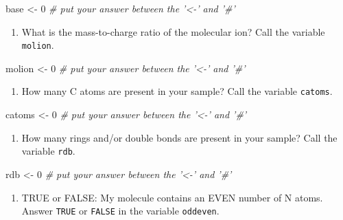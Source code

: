 \documentclass[]{tufte-book}
\newenvironment{Shaded}{}{}
\newcommand{\CommentTok}[1]{\textcolor[rgb]{0.38,0.63,0.69}{\textit{#1}}}
\newcommand{\DecValTok}[1]{\textcolor[rgb]{0.25,0.63,0.44}{#1}}
\newcommand{\NormalTok}[1]{#1}
\newcommand{\StringTok}[1]{\textcolor[rgb]{0.25,0.44,0.63}{#1}}
\providecommand{\tightlist}{%
  \setlength{\itemsep}{0pt}\setlength{\parskip}{0pt}}
\begin{document}
\begin{Shaded}
\begin{Highlighting}[]
\NormalTok{base <-}\StringTok{ }\DecValTok{0}     \CommentTok{# put your answer between the '<-' and '#'}
\end{Highlighting}
\end{Shaded}

\begin{enumerate}
\def\labelenumi{\arabic{enumi}.}
\setcounter{enumi}{1}
\tightlist
\item
  What is the mass-to-charge ratio of the molecular ion? Call the variable \texttt{molion}.
\end{enumerate}

\begin{Shaded}
\begin{Highlighting}[]
\NormalTok{molion <-}\StringTok{ }\DecValTok{0}     \CommentTok{# put your answer between the '<-' and '#'}
\end{Highlighting}
\end{Shaded}

\begin{enumerate}
\def\labelenumi{\arabic{enumi}.}
\setcounter{enumi}{2}
\tightlist
\item
  How many C atoms are present in your sample? Call the variable \texttt{catoms}.
\end{enumerate}

\begin{Shaded}
\begin{Highlighting}[]
\NormalTok{catoms <-}\StringTok{ }\DecValTok{0}     \CommentTok{# put your answer between the '<-' and '#'}
\end{Highlighting}
\end{Shaded}

\begin{enumerate}
\def\labelenumi{\arabic{enumi}.}
\setcounter{enumi}{3}
\tightlist
\item
  How many rings and/or double bonds are present in your sample? Call the variable \texttt{rdb}.
\end{enumerate}

\begin{Shaded}
\begin{Highlighting}[]
\NormalTok{rdb <-}\StringTok{ }\DecValTok{0}     \CommentTok{# put your answer between the '<-' and '#'}
\end{Highlighting}
\end{Shaded}

\begin{enumerate}
\def\labelenumi{\arabic{enumi}.}
\setcounter{enumi}{4}
\tightlist
\item
  TRUE or FALSE: My molecule contains an EVEN number of N atoms. Answer \texttt{TRUE} or \texttt{FALSE} in the variable \texttt{oddeven}.
\end{enumerate}
\end{document}
